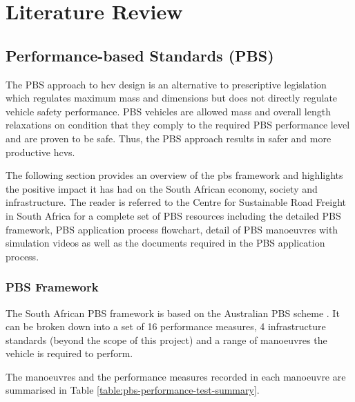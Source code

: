 \chapter{Literature Review}\label{chapter:literature-review}

\section{Performance-based Standards (PBS)}\label{section:performance-based-standards}

The PBS approach to \gls{hcv} design is an alternative to prescriptive legislation which regulates maximum mass and dimensions but does not directly regulate vehicle safety performance. PBS vehicles are allowed mass and overall length relaxations on condition that they comply to the required PBS performance level and are proven to be safe. Thus, the PBS approach results in safer and more productive \glspl{hcv}. 

The following section provides an overview of the \gls{pbs} framework and highlights the positive impact it has had on the South African economy, society and infrastructure. The reader is referred to the Centre for Sustainable Road Freight in South Africa \cite{Deiss2018} for a complete set of PBS resources including the detailed PBS framework, PBS application process flowchart, detail of PBS manoeuvres with simulation videos as well as the documents required in the PBS application process.

\subsection{PBS Framework}\label{section:pbs-framework}
  The South African PBS framework is based on the Australian PBS scheme \cite{NationalTransportCommission2008}. It can be broken down into a set of 16 performance measures, 4 infrastructure standards (beyond the scope of this project) and a range of manoeuvres the vehicle is required to perform. 

  The manoeuvres and the performance measures recorded in each manoeuvre are summarised in Table \ref{table:pbs-performance-test-summary}.

